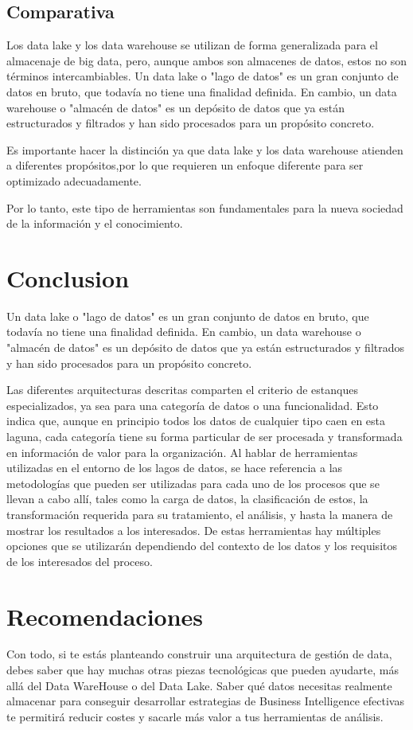 \documentclass{article}
\begin{document}
\begin{multicols}{2}
\subsection{Comparativa}
Los data lake y los data warehouse se utilizan de forma generalizada para el almacenaje de big data, pero, aunque ambos son almacenes de datos, estos no son términos intercambiables. Un data lake o "lago de datos" es un gran conjunto de datos en bruto, que todavía no tiene una finalidad definida. En cambio, un data warehouse o "almacén de datos" es un depósito de datos que ya están estructurados y filtrados y han sido procesados para un propósito concreto.

Es importante hacer la distinción ya que data lake y los data warehouse atienden a diferentes propósitos,por lo que requieren un enfoque diferente para ser optimizado adecuadamente.

Por lo tanto, este tipo de herramientas son fundamentales para la nueva sociedad de la información y el conocimiento.

\section{Conclusion}
Un data lake o "lago de datos" es un gran conjunto de datos en bruto, que todavía no tiene una finalidad definida. En cambio, un data warehouse o "almacén de datos" es un depósito de datos que ya están estructurados y filtrados y han sido procesados para un propósito concreto.

Las diferentes arquitecturas descritas comparten el criterio de estanques
especializados, ya sea para una categoría de datos o una funcionalidad. Esto indica
que, aunque en principio todos los datos de cualquier tipo caen en esta laguna, cada
categoría tiene su forma particular de ser procesada y transformada en información
de valor para la organización. 
Al hablar de herramientas utilizadas en el entorno de los lagos de datos, se hace
referencia a las metodologías que pueden ser utilizadas para cada uno de los
procesos que se llevan a cabo allí, tales como la carga de datos, la clasificación de
estos, la transformación requerida para su tratamiento, el análisis, y hasta la manera
de mostrar los resultados a los interesados. De estas herramientas hay múltiples
opciones que se utilizarán dependiendo del contexto de los datos y los requisitos de
los interesados del proceso. 


\section{Recomendaciones}
Con todo, si te estás planteando construir una arquitectura de gestión de data, debes saber que hay muchas otras piezas tecnológicas que pueden ayudarte, más allá del Data WareHouse o del Data Lake. Saber qué datos necesitas realmente almacenar para conseguir desarrollar estrategias de Business Intelligence efectivas te permitirá reducir costes y sacarle más valor a tus herramientas de análisis.



\end{multicols}
\end{document}
